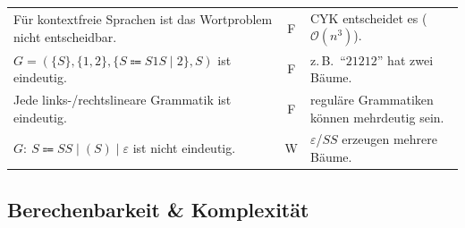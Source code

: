 \begin{mytable}
\begin{tabular}{@{}p{} c p{}@{}}
        Für kontextfreie Sprachen ist das Wortproblem nicht entscheidbar.
        & F & CYK entscheidet es ($\mathcal O(n^3)$).\\
        $G=(\{S\},\{1,2\},\{S\Coloneqq S1S\mid 2\},S)$ ist eindeutig.
        & F & z.\,B.\ ``$21212$'' hat zwei Bäume.\\
        Jede links-/rechtslineare Grammatik ist eindeutig.
        & F & reguläre Grammatiken können mehrdeutig sein.\\
        $G:\ S\Coloneqq SS\mid(S)\mid\varepsilon$ ist nicht eindeutig.
        & W & $\varepsilon$/$SS$ erzeugen mehrere Bäume.\\
        \hline
    \end{tabular}
\end{mytable}

\subsection{Berechenbarkeit \& Komplexität}
